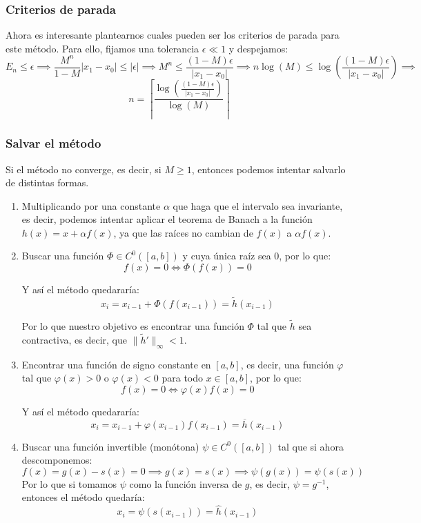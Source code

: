 \subsubsection{Criterios de parada}

Ahora es interesante plantearnos cuales pueden ser los criterios de parada para este método. Para ello, fijamos una tolerancia $\epsilon \ll 1$ y despejamos:
\[
    E_n \leq \epsilon \implies
    \frac{M^n}{1-M}|x_1-x_0| \leq |\epsilon| \implies
    M^n \leq \frac{(1-M)\epsilon}{|x_1-x_0|} \implies
    n \log(M) \leq \log\left( \frac{(1-M)\epsilon}{|x_1-x_0|} \right) \implies
\]
\[
    \boxed{
        n = \left\lceil \frac{\log\left( \frac{(1-M)\epsilon}{|x_1-x_0|} \right)}{\log(M)} \right\rceil
    }
\]

\subsubsection{Salvar el método}

Si el método no converge, es decir, si $M \geq 1$, entonces podemos intentar salvarlo de distintas formas.

\begin{enumerate}
    \item Multiplicando por una constante $\alpha$ que haga que el intervalo sea invariante, es decir, podemos intentar aplicar el teorema de Banach a la función $h(x) = x + \alpha f(x)$, ya que las raíces no cambian de $f(x)$ a $\alpha f(x)$.
    \item Buscar una función $\Phi \in C^0([a,b])$ y cuya única raíz sea 0, por lo que:
    \[
        f(x) = 0 \iff \Phi(f(x)) = 0
    \]

    Y así el método quedararía:
    \[
        x_i = x_{i-1} + \Phi(f(x_{i-1})) = \widetilde{h}(x_{i-1})
    \]

    Por lo que nuestro objetivo es encontrar una función $\Phi$ tal que $\widetilde{h}$ sea contractiva, es decir, que $\| \widetilde{h}' \|_\infty < 1$. 

    \item Encontrar una función de signo constante en $[a,b]$, es decir, una función $\varphi$ tal que $\varphi(x) > 0$ o $\varphi(x) < 0$ para todo $x \in [a,b]$, por lo que:
    \[
        f(x) = 0 \iff \varphi(x)f(x) = 0
    \]

    Y así el método quedararía:
    \[
        x_i = x_{i-1} + \varphi(x_{i-1})f(x_{i-1}) = \overline{h}(x_{i-1})
    \]

    \item Buscar una función invertible (monótona) $\psi \in C^0([a,b])$ tal que si ahora descomponemos:
    \[
        f(x) = g(x) - s(x) = 0 \implies
        g(x) = s(x) \implies
        \psi(g(x)) = \psi(s(x))
    \]
    Por lo que si tomamos $\psi$ como la función inversa de $g$, es decir, $\psi = g^{-1}$, entonces el método quedaría:
    \[
        x_i = \psi(s(x_{i-1})) = \widehat{h}(x_{i-1})
    \]
\end{enumerate}


